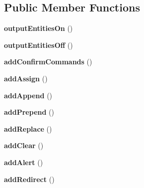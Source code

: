 \subsection*{Public Member Functions}
\begin{DoxyCompactItemize}
\item 
\hypertarget{classlegacyXajaxResponse_a78e668747b96dfe97e8315cde03c20d6}{
{\bfseries outputEntitiesOn} ()}
\label{classlegacyXajaxResponse_a78e668747b96dfe97e8315cde03c20d6}

\item 
\hypertarget{classlegacyXajaxResponse_a93d38de131ef4f40eec29b0535a3174d}{
{\bfseries outputEntitiesOff} ()}
\label{classlegacyXajaxResponse_a93d38de131ef4f40eec29b0535a3174d}

\item 
\hypertarget{classlegacyXajaxResponse_a45673693de4847b0cc4114538086c845}{
{\bfseries addConfirmCommands} ()}
\label{classlegacyXajaxResponse_a45673693de4847b0cc4114538086c845}

\item 
\hypertarget{classlegacyXajaxResponse_acfc75f52b1d326ad1850ddb8dcbe6613}{
{\bfseries addAssign} ()}
\label{classlegacyXajaxResponse_acfc75f52b1d326ad1850ddb8dcbe6613}

\item 
\hypertarget{classlegacyXajaxResponse_ad0942b5cd9b227bf456e11f525ba2a83}{
{\bfseries addAppend} ()}
\label{classlegacyXajaxResponse_ad0942b5cd9b227bf456e11f525ba2a83}

\item 
\hypertarget{classlegacyXajaxResponse_a0c923c5dc8ffed755a47e896a125e47c}{
{\bfseries addPrepend} ()}
\label{classlegacyXajaxResponse_a0c923c5dc8ffed755a47e896a125e47c}

\item 
\hypertarget{classlegacyXajaxResponse_a6fa774c5e0e02c83d0195d4651be6111}{
{\bfseries addReplace} ()}
\label{classlegacyXajaxResponse_a6fa774c5e0e02c83d0195d4651be6111}

\item 
\hypertarget{classlegacyXajaxResponse_a904fa1a032c6823ce17c28bee87cf67c}{
{\bfseries addClear} ()}
\label{classlegacyXajaxResponse_a904fa1a032c6823ce17c28bee87cf67c}

\item 
\hypertarget{classlegacyXajaxResponse_ae03ba93a48c723dbac7f246452d6ebf1}{
{\bfseries addAlert} ()}
\label{classlegacyXajaxResponse_ae03ba93a48c723dbac7f246452d6ebf1}

\item 
\hypertarget{classlegacyXajaxResponse_a53ed01e6e959e9f4f720eb483355870a}{
{\bfseries addRedirect} ()}
\label{classlegacyXajaxResponse_a53ed01e6e959e9f4f720eb483355870a}


\end{DoxyCompactItemize}
